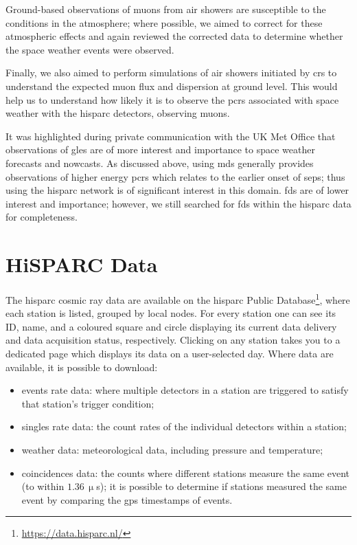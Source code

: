 Ground-based observations of muons from air showers are susceptible to the conditions in the atmosphere; where possible, we aimed to correct for these atmospheric effects and again reviewed the corrected data to determine whether the space weather events were observed.

Finally, we also aimed to perform simulations of air showers initiated by \glspl{cr} to understand the expected muon flux and dispersion at ground level. This would help us to understand how likely it is to observe the \glspl{pcr} associated with space weather with the \gls{hisparc} detectors, observing muons.

It was highlighted during private communication with the UK Met Office that observations of \glspl{gle} are of more interest and importance to space weather forecasts and nowcasts. As discussed above, using \glspl{md} generally provides observations of higher energy \glspl{pcr} which relates to the earlier onset of \glspl{sep}; thus using the \gls{hisparc} network is of significant interest in this domain. \glspl{fd} are of lower interest and importance; however, we still searched for \glspl{fd} within the \gls{hisparc} data for completeness. 


\section{HiSPARC Data}\label{sec:HS_data}


The \gls{hisparc} cosmic ray data are available on the \gls{hisparc} Public Database\footnote{\url{https://data.hisparc.nl/}}, where each station is listed, grouped by local nodes. For every station one can see its ID, name, and a coloured square and circle displaying its current data delivery and data acquisition status, respectively. Clicking on any station takes you to a dedicated page which displays its data on a user-selected day. Where data are available, it is possible to download: %
%
\begin{itemize}
	\item{events rate data: where multiple detectors in a station are triggered to satisfy that station's trigger condition;}
	\item{singles rate data: the count rates of the individual detectors within a station;}
	\item{weather data: meteorological data, including pressure and temperature;}
	\item{coincidences data: the counts where different stations measure the same event (to within $1.36 \, \upmu$s); it is possible to determine if stations measured the same event by comparing the \gls{gps} timestamps of events.}
\end{itemize}


